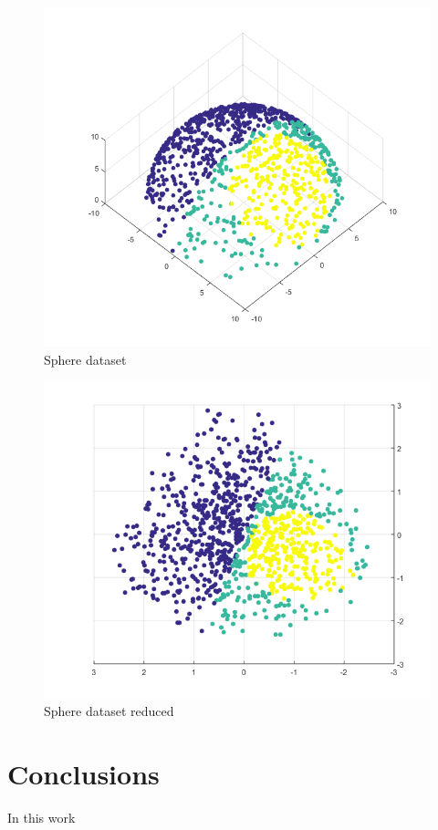 \documentclass[12pt,journal]{IEEEtran}
\begin{document}
\begin{figure}[H]
    \centering
    \includegraphics[width=0.8\linewidth]{images/sphere.png}
    \caption{Sphere dataset}
    \label{sphere}
\end{figure}

\begin{figure}[H]
    \centering
    \includegraphics[width=0.8\linewidth]{images/sphere_result.png}
    \caption{Sphere dataset reduced}
    \label{sphere_res}
\end{figure}

\section{Conclusions}

In this work



\end{document}

